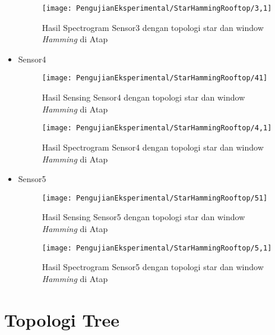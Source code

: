 \begin{itemize}
\begin{figure}[H]
	\centering
	\texttt{[image: PengujianEksperimental/StarHammingRooftop/3,1]}
	\caption[Hasil Spectrogram Sensor3 dengan topologi star dan window {\it Hamming} di Atap]{Hasil Spectrogram Sensor3 dengan topologi star dan window {\it Hamming} di Atap} 
	\label{fig:hasilAtapStarHamm3,1}
\end{figure}

\item Sensor4
\begin{figure}[H]
	\centering
	\texttt{[image: PengujianEksperimental/StarHammingRooftop/41]}
	\caption[Hasil Sensing Sensor4 dengan topologi star dan window {\it Hamming} di Atap]{Hasil Sensing Sensor4 dengan topologi star dan window {\it Hamming} di Atap} 
	\label{fig:hasilAtapStarHamm41}
\end{figure}

\begin{figure}[H]
	\centering
	\texttt{[image: PengujianEksperimental/StarHammingRooftop/4,1]}
	\caption[Hasil Spectrogram Sensor4 dengan topologi star dan window {\it Hamming} di Atap]{Hasil Spectrogram Sensor4 dengan topologi star dan window {\it Hamming} di Atap} 
	\label{fig:hasilAtapStarHamm4,1}
\end{figure}

\item Sensor5
\begin{figure}[H]
	\centering
	\texttt{[image: PengujianEksperimental/StarHammingRooftop/51]}
	\caption[Hasil Sensing Sensor5 dengan topologi star dan window {\it Hamming} di Atap]{Hasil Sensing Sensor5 dengan topologi star dan window {\it Hamming} di Atap} 
	\label{fig:hasilAtapStarHamm51}
\end{figure}

\begin{figure}[H]
	\centering
	\texttt{[image: PengujianEksperimental/StarHammingRooftop/5,1]}
	\caption[Hasil Spectrogram Sensor5 dengan topologi star dan window {\it Hamming} di Atap]{Hasil Spectrogram Sensor5 dengan topologi star dan window {\it Hamming} di Atap} 
	\label{fig:hasilAtapStarHamm5,1}
\end{figure}
\end{itemize}

\section{Topologi Tree}
